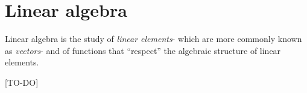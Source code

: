 \chapter{Linear algebra}
\label{ch::lin_alg}

Linear algebra is the study of \textit{linear elements}- which are more commonly known as \textit{vectors}- and of functions that ``respect'' the algebraic structure of linear elements.

[TO-DO]

\newpage

